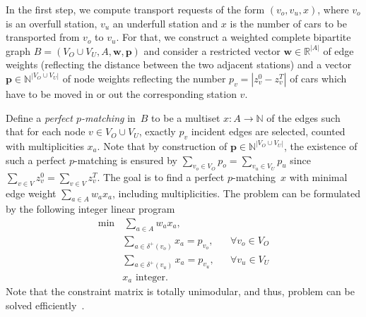 \documentclass[english]{llncs}
\numberwithin{sublemma}{lemma}
\newcommand{\NN}{\ensuremath{\mathbb{N}}}
\newcommand{\RR}{\ensuremath{\mathbb{R}}}
\newcommand{\VO}{V_O}
\newcommand{\VU}{V_U}
\begin{document}
In the first step, we compute transport requests of the form $(v_o, v_u, x)$, where $v_o$ is an overfull station, $v_u$ an underfull station and $x$ is the number of cars to be transported from $v_o$ to $v_u$. 
For that, we construct a weighted complete bipartite graph $B = (\VO \cup \VU, A, \boldsymbol{w}, \boldsymbol{p})$ and
consider a restricted vector $\boldsymbol{w} \in \RR^{|A|}$ of edge weights (reflecting the distance between the two adjacent stations)
and a vector $\boldsymbol{p} \in \NN^{|\VO \cup \VU|}$ of node weights reflecting the number $p_v = |z_v^0-z_v^T|$ of cars which have to be moved in or out the corresponding station $v$.


Define a \emph{perfect $p$-matching} in~$B$ to be a multiset $x \colon A \rightarrow \NN$ of the edges such that for each node $v \in \VO \cup \VU$,
exactly $p_v$ incident edges are selected, counted with multiplicities $x_a$. 
Note that by construction of $\boldsymbol{p} \in \NN^{|\VO \cup \VU|}$, the existence of such a perfect $p$-matching
is ensured by $\sum_{v_o \in \VO} p_{o} = \sum_{v_u \in \VU} p_{u}$ since $\sum_{v \in V} z_v^0 = \sum_{v \in V} z_v^T$. 
The goal is to find a perfect $p$-matching~$x$ with minimal edge weight $\sum_{a \in A} w_a x_a$, including multiplicities.
The problem can be formulated by the following integer linear program
\begin{subequations}
\label{eq: static: reopt: matching: ilp}
  \begin{flalign}
    \min& \,  \sum_{a\in A} w_a x_a,                                                                                                                            \label{eq: static: reopt: matching: ilp: 1}\\
    & \sum_{a \in \delta^+(v_o)} x_a = p_{v_o},                                                                 && \forall v_o \in V_O                          \label{eq: static: reopt: matching: ilp: 10}\\
    & \sum_{a \in \delta^+(v_u)} x_a = p_{v_u},                                                                 && \forall v_u \in V_U                          \label{eq: static: reopt: matching: ilp: 11}\\
    & x_a \text{ integer}.                                                                                                                                      \label{eq: static: reopt: matching: ilp: 21}
  \end{flalign}
\end{subequations}
Note that the constraint matrix is totally unimodular, and thus, problem can be solved efficiently~\cite{}.
\end{document}
